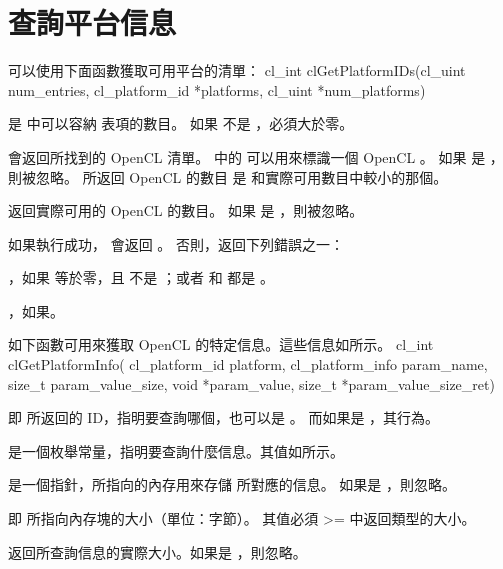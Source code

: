 \section{查詢平台信息}
可以使用下面函數獲取可用平台的清單：
\startclc
cl_int clGetPlatformIDs(cl_uint num_entries,
			cl_platform_id *platforms,
			cl_uint *num_platforms)
\stopclc

 是  中可以容納  表項的數目。
如果  不是 ，必須大於零。

 會返回所找到的 OpenCL  清單。
 中的  可以用來標識一個 OpenCL 。
如果  是 ，則被忽略。
所返回 OpenCL  的數目 是  和實際可用數目中較小的那個。

 返回實際可用的 OpenCL  的數目。
如果  是 ，則被忽略。

如果執行成功， 會返回 。
否則，返回下列錯誤之一：
\startigBase
\item {}，如果  等於零，且  不是 ；或者  和  都是 。
\item {}，如果\schostfailres。
\stopigBase

如下函數可用來獲取 OpenCL 的特定信息。這些信息如所示。
\startclc
cl_int clGetPlatformInfo(
		cl_platform_id platform,
		cl_platform_info param_name,
		size_t param_value_size,
		void *param_value,
		size_t *param_value_size_ret)
\stopclc

 即  所返回的 ID，指明要查詢哪個，也可以是 。
而如果是 ，其行為。

 是一個枚舉常量，指明要查詢什麼信息。其值如所示。

 是一個指針，所指向的內存用來存儲  所對應的信息。
如果是 ，則忽略。

 即  所指向內存塊的大小（單位：字節）。
其值必須 >= 中返回類型的大小。

 返回所查詢信息的實際大小。如果是 ，則忽略。

